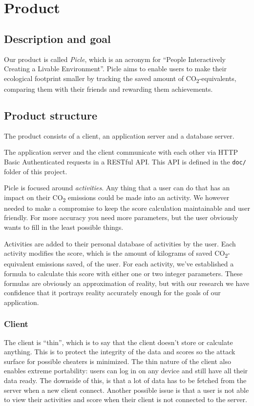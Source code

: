 \chapter{Product}\label{ch:product}

\section{Description and goal}
Our product is called \emph{Picle}, which is an acronym for ``People Interactively Creating
a Livable Environment''. Picle aims to enable users to make their ecological footprint
smaller by tracking the saved amount of CO\textsubscript{2}-equivalents, comparing them
with their friends and rewarding them achievements.

\section{Product structure}
The product consists of a client, an application server and a database server.

The application server and the client communicate with each other via HTTP Basic Authenticated
requests in a RESTful API. This API is defined in the \verb+doc/+ folder of this project.

Picle is focused around \emph{activities}. Any thing that a user can do that has an impact
on their CO\textsubscript{2} emissions could be made into an activity. We however needed
to make a compromise to keep the score calculation maintainable and user friendly. For
more accuracy you need more parameters, but the user obviously wants to fill in the least
possible things.

Activities are added to their personal database of activities by the user. Each activity
modifies the score, which is the amount of kilograms of saved CO\textsubscript{2}-equivalent
emissions saved, of the user. For each activity, we've established a formula to calculate
this score with either one or two integer parameters. These formulas are obviously an
approximation of reality, but with our research we have confidence that it portrays
reality accurately enough for the goals of our application.

\subsection{Client}
The client is ``thin'', which is to say that the client doesn't store or calculate anything.
This is to protect the integrity of the data and scores so the attack surface for
possible cheaters is minimized. The thin nature of the client also enables extreme
portability: users can log in on any device and still have all their data ready. The
downside of this, is that a lot of data has to be fetched from the server when a new
client connect. Another possible issue is that a user is not able to view their activities
and score when their client is not connected to the server.

